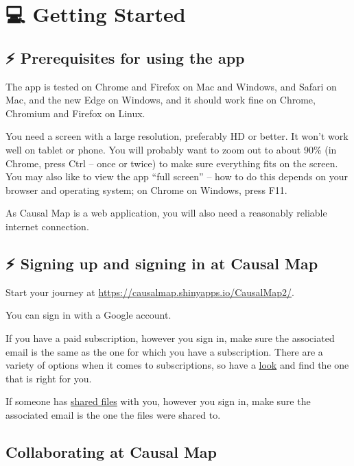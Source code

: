 \documentclass[
]{book}
\begin{document}
\hypertarget{part-getting-started}{%
\part{💻 Getting Started}\label{part-getting-started}}

\hypertarget{prerequisites-for-using-the-app}{%
\chapter{⚡ Prerequisites for using the app}\label{prerequisites-for-using-the-app}}

The app is tested on Chrome and Firefox on Mac and Windows, and Safari on Mac, and the new Edge on Windows, and it should work fine on Chrome, Chromium and Firefox on Linux.

You need a screen with a large resolution, preferably HD or better. It won't work well on tablet or phone. You will probably want to zoom out to about 90\% (in Chrome, press Ctrl -- once or twice) to make sure everything fits on the screen. You may also like to view the app ``full screen'' -- how to do this depends on your browser and operating system; on Chrome on Windows, press F11.

As Causal Map is a web application, you will also need a reasonably reliable internet connection.

\hypertarget{signing-up-and-signing-in-at-causal-map}{%
\chapter{⚡ Signing up and signing in at Causal Map}\label{signing-up-and-signing-in-at-causal-map}}

Start your journey at \url{https://causalmap.shinyapps.io/CausalMap2/}.

You can sign in with a Google account.

If you have a paid subscription, however you sign in, make sure the associated email is the same as the one for which you have a subscription. There are a variety of options when it comes to subscriptions, so have a \href{https://causalmap.app/subscriptions/}{look} and find the one that is right for you.

If someone has \protect\hyperlink{xpermissions}{shared files} with you, however you sign in, make sure the associated email is the one the files were shared to.

\hypertarget{collaborating-at-causal-map}{%
\chapter{Collaborating at Causal Map}\label{collaborating-at-causal-map}}
\end{document}
